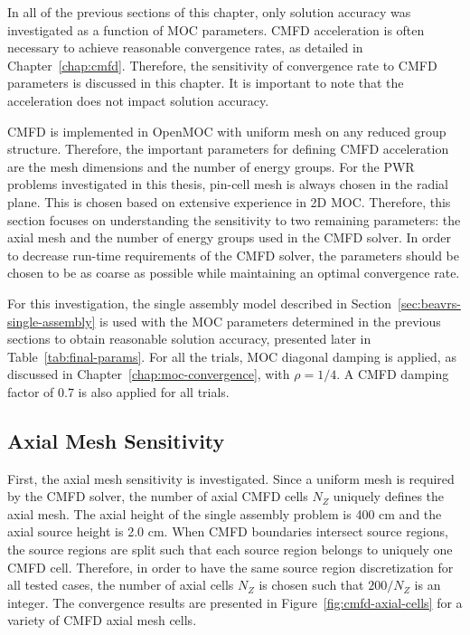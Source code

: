 In all of the previous sections of this chapter, only solution accuracy was investigated as a function of \ac{MOC} parameters. \ac{CMFD} acceleration is often necessary to achieve reasonable convergence rates, as detailed in Chapter~\ref{chap:cmfd}. Therefore, the sensitivity of convergence rate to \ac{CMFD} parameters is discussed in this chapter. It is important to note that the acceleration does not impact solution accuracy.

\ac{CMFD} is implemented in OpenMOC with uniform mesh on any reduced group structure. Therefore, the important parameters for defining \ac{CMFD} acceleration are the mesh dimensions and the number of energy groups. For the \ac{PWR} problems investigated in this thesis, pin-cell mesh is always chosen in the radial plane. This is chosen based on extensive experience in 2D \ac{MOC}. Therefore, this section focuses on understanding the sensitivity to two remaining parameters: the axial mesh and the number of energy groups used in the \ac{CMFD} solver. In order to decrease run-time requirements of the \ac{CMFD} solver, the parameters should be chosen to be as coarse as possible while maintaining an optimal convergence rate.

For this investigation, the single assembly model described in Section~\ref{sec:beavrs-single-assembly} is used with the \ac{MOC} parameters determined in the previous sections to obtain reasonable solution accuracy, presented later in Table~\ref{tab:final-params}. For all the trials, \ac{MOC} diagonal damping is applied, as discussed in Chapter~\ref{chap:moc-convergence}, with $\rho = 1/4$. A \ac{CMFD} damping factor of 0.7 is also applied for all trials.

\subsection{Axial Mesh Sensitivity}
First, the axial mesh sensitivity is investigated. Since a uniform mesh is required by the \ac{CMFD} solver, the number of axial \ac{CMFD} cells $N_Z$ uniquely defines the axial mesh. The axial height of the single assembly problem is 400 cm and the axial source height is 2.0 cm. When \ac{CMFD} boundaries intersect source regions, the source regions are split such that each source region belongs to uniquely one \ac{CMFD} cell. Therefore, in order to have the same source region discretization for all tested cases, the number of axial cells $N_Z$ is chosen such that $200 / N_Z$ is an integer. The convergence results are presented in Figure~\ref{fig:cmfd-axial-cells} for a variety of \ac{CMFD} axial mesh cells. 

